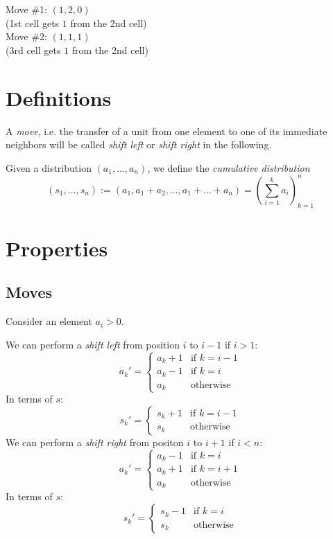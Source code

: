 \documentclass{article}
\begin{document}
Move \#1: $(1, 2, 0)$ \\
(1st cell gets $1$ from the 2nd cell) \\
Move \#2: $(1, 1, 1)$ \\
(3rd cell gets $1$ from the 2nd cell)

\section*{Definitions}
A \textit{move}, i.e. the transfer of a unit from one element to one
of its immediate neighbors will be called \textit{shift left} or
\textit{shift right} in the following.

Given a distribution $(a_1,\ldots, a_n)$, we define the
\textit{cumulative distribution}
\begin{displaymath}
  (s_1,\ldots,s_n) := (a_1, a_1 + a_2,\ldots,a_1 +\ldots+ a_n) =
  \left(\sum_{i=1}^k a_i \right)_{k=1}^n
\end{displaymath}

\section*{Properties}
\subsection*{Moves}
Consider an element $a_i > 0$.

We can perform a \textit{shift left} from position $i$ to $i - 1$ if
$i > 1$: 
\begin{displaymath}
  a_k' = \left\{
    \begin{array}{ll}
      a_k + 1 & \textrm{if } k = i - 1 \\
      a_k - 1 & \textrm{if } k = i \\
      a_k & \textrm{otherwise}
    \end{array}
  \right.
\end{displaymath}
In terms of $s$:
\begin{displaymath}
  s_k' = \left\{
    \begin{array}{ll}
      s_k + 1 & \textrm{if } k = i - 1 \\
      s_k & \textrm{otherwise}
    \end{array}
  \right.
\end{displaymath}
We can perform a \textit{shift right} from positon $i$ to $i + 1$ if
$i < n$: 
\begin{displaymath}
  a_k' = \left\{
      \begin{array}{ll}
        a_k - 1 & \textrm{if } k = i \\
        a_k + 1 & \textrm{if } k = i + 1 \\
        a_k & \textrm{otherwise}
      \end{array}
    \right.
\end{displaymath}
In terms of $s$:
\begin{displaymath}
  s_k' = \left\{
    \begin{array}{ll}
      s_k - 1 & \textrm{if } k = i \\
      s_k & \textrm{otherwise}
    \end{array}
  \right.
\end{displaymath}
\end{document}
